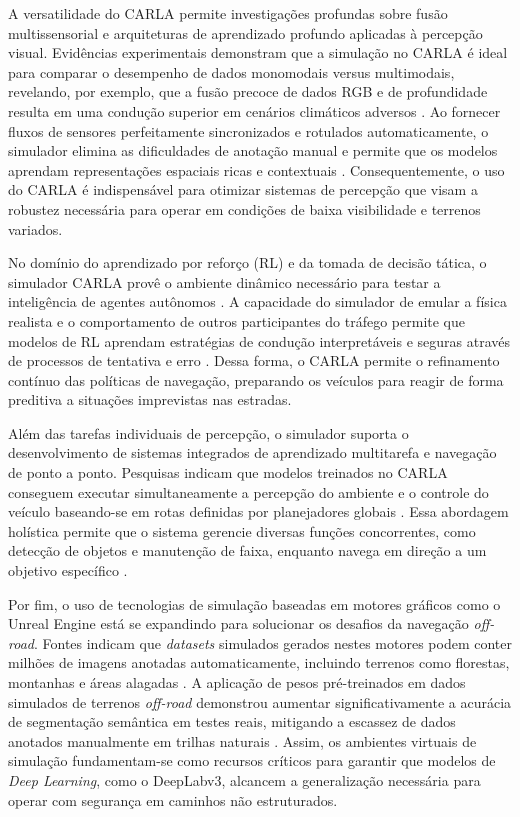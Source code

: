 \documentclass[a4paper,10pt, twocolumn]{article}
\begin{document}
A versatilidade do CARLA permite investigações profundas sobre fusão multissensorial e arquiteturas de aprendizado profundo aplicadas 
à percepção visual. Evidências experimentais demonstram que a simulação no CARLA é ideal para comparar o desempenho de dados 
monomodais versus multimodais, revelando, por exemplo, que a fusão precoce de dados RGB e de profundidade resulta em uma 
condução superior em cenários climáticos adversos \cite{10.1145/3729420}. Ao fornecer fluxos de sensores perfeitamente 
sincronizados e rotulados 
automaticamente, o simulador elimina as dificuldades de anotação manual e permite que os modelos aprendam representações 
espaciais ricas e contextuais \cite{10.1145/3729420}. Consequentemente, o uso do CARLA é indispensável para otimizar 
sistemas de percepção que visam a 
robustez necessária para operar em condições de baixa visibilidade e terrenos variados.

No domínio do aprendizado por reforço (RL) e da tomada de decisão tática, o simulador CARLA provê o ambiente dinâmico necessário 
para testar a inteligência de agentes autônomos \cite{10.1145/3729420}. A capacidade do simulador de emular a física realista e o comportamento de outros participantes do 
tráfego permite que modelos de RL aprendam estratégias de condução interpretáveis e seguras através de processos de tentativa e erro \cite{10.1145/3729420}. 
Dessa forma, o CARLA permite o refinamento contínuo das políticas de navegação, preparando os veículos para reagir de forma preditiva a 
situações imprevistas nas estradas.

Além das tarefas individuais de percepção, o simulador suporta o desenvolvimento de sistemas integrados de aprendizado multitarefa e 
navegação de ponto a ponto. Pesquisas indicam que modelos treinados no CARLA conseguem executar simultaneamente a percepção do ambiente 
e o controle do veículo baseando-se em rotas definidas por planejadores globais \cite{10.1145/3729420}. Essa abordagem holística permite que o sistema gerencie 
diversas funções concorrentes, como detecção de objetos e manutenção de faixa, enquanto navega em direção a um objetivo 
específico \cite{10.1145/3729420}.

Por fim, o uso de tecnologias de simulação baseadas em motores gráficos como o Unreal Engine está se expandindo para 
solucionar os desafios da navegação \textit{off-road}. Fontes indicam que \textit{datasets} simulados gerados nestes motores podem 
conter milhões de 
imagens anotadas automaticamente, incluindo terrenos como florestas, montanhas e áreas alagadas \cite{Sgibnev2020}. 
A aplicação de pesos 
pré-treinados em dados simulados de terrenos \textit{off-road} demonstrou aumentar significativamente a acurácia de segmentação 
semântica em testes reais, mitigando a escassez de dados anotados manualmente em trilhas naturais \cite{Sgibnev2020}. Assim, os ambientes 
virtuais de simulação fundamentam-se como recursos críticos para garantir que modelos de \textit{Deep Learning}, como o DeepLabv3, alcancem a 
generalização necessária para operar com segurança em caminhos não estruturados\cite{Sgibnev2020}.
\end{document}

